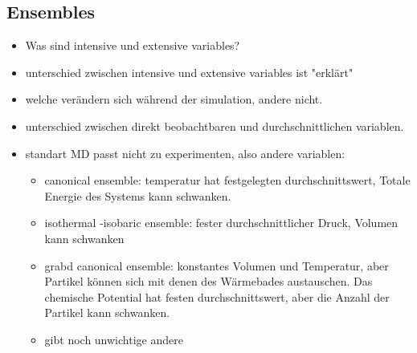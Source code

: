 \documentclass[]{article}
\begin{document}
\subsection{Ensembles}
\begin{itemize}
	\item Was sind intensive und extensive variables? 
	\item unterschied zwischen intensive und extensive variables ist "erklärt"
	\item welche verändern sich während der simulation, andere nicht. 
	\item unterschied zwischen direkt beobachtbaren und durchschnittlichen variablen. 
	\item standart MD passt nicht zu experimenten, also andere variablen:
	\begin{itemize}
		\item canonical ensemble: temperatur hat festgelegten durchschnittswert, Totale Energie des Systems kann schwanken. 
		\item isothermal -isobaric ensemble: fester durchschnittlicher Druck, Volumen kann schwanken
		\item grabd canonical ensemble: konstantes Volumen und Temperatur, aber Partikel können sich mit denen des Wärmebades austauschen. Das chemische Potential hat festen durchschnittswert, aber die Anzahl der Partikel kann schwanken. 
		\item gibt noch unwichtige andere
	\end{itemize}
\end{itemize}
\end{document}
